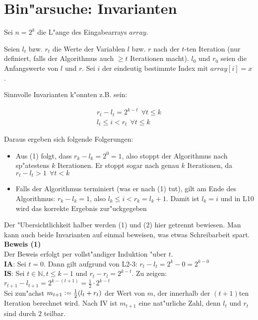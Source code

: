 \documentclass{scrartcl}
\newcommand{\defeq}{\vcentcolon=}
\begin{document}
\section{Bin"arsuche: Invarianten}

Sei $n = 2^k$ die L"ange des Eingabearrays $array$.

Seien $l_t$ bzw. $r_t$ die Werte der Variablen $l$ bzw. $r$ nach der $t$-ten Iteration (nur definiert, falls der Algorithmus auch
$\geq t$ Iterationen macht). $l_0$ und $r_0$ seien die Anfangswerte von $l$ und $r$.
Sei $i$ der eindeutig bestimmte Index mit $array[i] = x$.

Sinnvolle Invarianten k"onnten z.B. sein:

\begin{align}
r_t - l_t = 2^{k-t} \ \ \forall t \leq k \\
l_t \leq i < r_t \ \ \forall t \leq k
\end{align}

Daraus ergeben sich folgende Folgerungen:

\begin{itemize}
\item Aus (1) folgt, dass $r_k - l_k = 2^0 = 1$, also stoppt der Algorithmus nach sp"atestens $k$ Iterationen.
Er stoppt sogar nach genau $k$ Iterationen, da $r_t - l_t > 1 \ \ \forall t < k$
\item Falls der Algorithmus terminiert (was er nach (1) tut), gilt am Ende des Algorithmus:
      $r_k - l_k = 1$, also $l_k \leq i < r_k = l_k + 1$. Damit ist $l_k = i$ und in L10 wird
      das korrekte Ergebnis zur"uckgegeben
\end{itemize}

Der "Ubersichtlichkeit halber werden (1) und (2) hier getrennt bewiesen. Man kann auch
beide Invarianten auf einmal beweisen, was etwas Schreibarbeit spart. \\

\noindent\textbf{Beweis (1)}\\

Der Beweis erfolgt per vollst"andiger Induktion "uber $t$.\\

\noindent\textbf{IA}: Sei $t = 0$. Dann gilt aufgrund von L2-3: $r_t - l_t = 2^k - 0 = 2^{k-0}$ \\
\textbf{IS}: Sei $t \in \mathbb{N}, t \leq k - 1$ und $r_t - r_l = 2^{k-t}$. Zu zeigen: $r_{t+1} - l_{t+1} = 2^{k-(t+1)} = \frac{1}{2}\cdot 2^{k-t}$ \\

Sei zun"achst $m_{t+1} \defeq \frac{1}{2}(l_t + r_t)$ der Wert von $m$, der innerhalb der $(t+1)$ten Iteration berechnet wird.
Nach IV ist $m_{t+1}$ eine nat"urliche Zahl, denn $l_t$ und $r_t$ sind durch $2$ teilbar.
\end{document}
